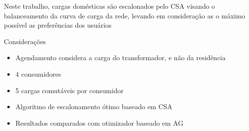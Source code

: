 \begin{frame}
  Neste trabalho, cargas domésticas são escalonados pelo CSA visando o
  balanceamento da curva de carga da rede, levando em consideração as o máximo
  possível as preferências dos usuários
  \begin{block}{Considerações}
    \begin{itemize}
      \item Agendamento considera a carga do transformador, e não da residência
      \item 4 consumidores
      \item 5 cargas comutáveis por consumidor
      \item Algoritmo de escalonamento ótimo baseado em CSA
      \item Resultados comparados com otimizador baseado em AG
    \end{itemize}
  \end{block}
\end{frame}






%
